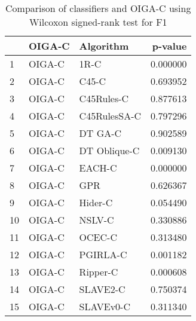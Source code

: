 \begin{table}
\footnotesize
\caption{Comparison of classifiers and OIGA-C using Wilcoxon signed-rank test for F1}
\label{tab:OIGA-C wilcoxon F1 comparison}
\begin{tabular}{lllr}
\hline
 & OIGA-C & Algorithm & p-value \\
\hline
1 & OIGA-C & 1R-C & 0.000000 \\
2 & OIGA-C & C45-C & 0.693952 \\
3 & OIGA-C & C45Rules-C & 0.877613 \\
4 & OIGA-C & C45RulesSA-C & 0.797296 \\
5 & OIGA-C & DT GA-C & 0.902589 \\
6 & OIGA-C & DT Oblique-C & 0.009130 \\
7 & OIGA-C & EACH-C & 0.000000 \\
8 & OIGA-C & GPR & 0.626367 \\
9 & OIGA-C & Hider-C & 0.054490 \\
10 & OIGA-C & NSLV-C & 0.330886 \\
11 & OIGA-C & OCEC-C & 0.313480 \\
12 & OIGA-C & PGIRLA-C & 0.001182 \\
13 & OIGA-C & Ripper-C & 0.000608 \\
14 & OIGA-C & SLAVE2-C & 0.750374 \\
15 & OIGA-C & SLAVEv0-C & 0.311340 \\
\hline
\end{tabular}
\end{table}
